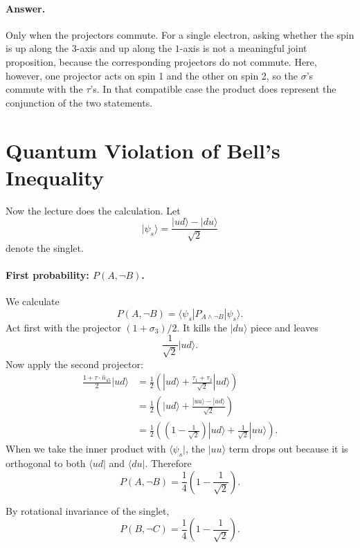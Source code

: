 \paragraph{Answer.} Only when the projectors commute. For a single electron, asking whether the spin is up along the \(3\)-axis and up along the \(1\)-axis is not a meaningful joint proposition, because the corresponding projectors do not commute. Here, however, one projector acts on spin 1 and the other on spin 2, so the \(\sigma\)'s commute with the \(\tau\)'s. In that compatible case the product does represent the conjunction of the two statements.

\section{Quantum Violation of Bell's Inequality}

Now the lecture does the calculation. Let
\begin{equation}
|\psi_s\rangle
=
\frac{|ud\rangle-|du\rangle}{\sqrt{2}}
\end{equation}
denote the singlet.

\paragraph{First probability: \(P(A,\neg B)\).}
We calculate
\[
P(A,\neg B)=\langle \psi_s|P_{A\wedge \neg B}|\psi_s\rangle.
\]
Act first with the projector \((1+\sigma_3)/2\). It kills the \(|du\rangle\) piece and leaves
\[
\frac{1}{\sqrt{2}}|ud\rangle.
\]
Now apply the second projector:
\begin{align}
\frac{1+\tau\cdot \hat n_{45}}{2}|ud\rangle
&=
\frac{1}{2}
\left(
|ud\rangle
+
\frac{\tau_1+\tau_3}{\sqrt{2}}|ud\rangle
\right) \\
&=
\frac{1}{2}
\left(
|ud\rangle
+
\frac{|uu\rangle-|ud\rangle}{\sqrt{2}}
\right) \\
&=
\frac{1}{2}
\left(
\left(1-\frac{1}{\sqrt{2}}\right)|ud\rangle
+
\frac{1}{\sqrt{2}}|uu\rangle
\right).
\end{align}
When we take the inner product with \(\langle\psi_s|\), the \(|uu\rangle\) term drops out because it is orthogonal to both \(\langle ud|\) and \(\langle du|\). Therefore
\begin{equation}
P(A,\neg B)
=
\frac{1}{4}\left(1-\frac{1}{\sqrt{2}}\right).
\end{equation}

By rotational invariance of the singlet,
\begin{equation}
P(B,\neg C)
=
\frac{1}{4}\left(1-\frac{1}{\sqrt{2}}\right).
\end{equation}

